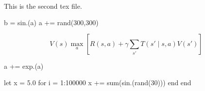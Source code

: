 This is the second tex file.

\begin{jlcode}
b = sin.(a)
a += rand(300,300)
\end{jlcode}

\begin{equation}
V(s) \max_a [R(s, a) + \gamma \sum_{s'} T(s' \mid s, a) V(s')]
\end{equation}

\begin{jlcode}
a += exp.(a)
\end{jlcode}

\begin{jlcode}
let
    x = 5.0
    for i = 1:100000
        x += sum(sin.(rand(30)))
    end
end
\end{jlcode}
